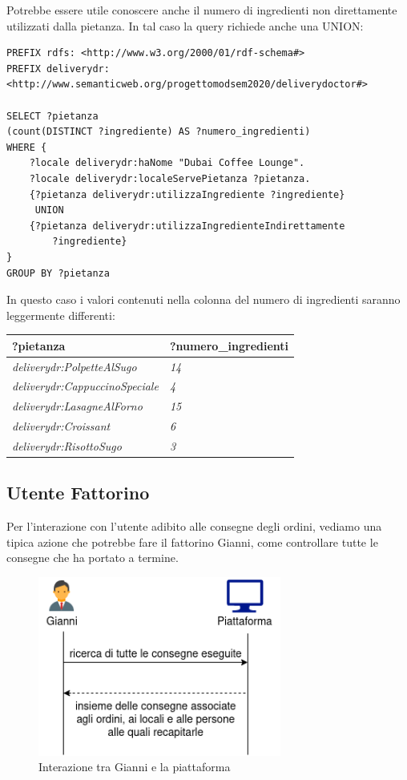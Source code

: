 \documentclass[12pt]{article}
\begin{document}
\newline
\newline
Potrebbe essere utile conoscere anche il numero di ingredienti non direttamente utilizzati dalla pietanza. In tal caso la query richiede anche una UNION:
\begin{lstlisting}[language=SPARQL]
PREFIX rdfs: <http://www.w3.org/2000/01/rdf-schema#>
PREFIX deliverydr: 
<http://www.semanticweb.org/progettomodsem2020/deliverydoctor#>

SELECT ?pietanza 
(count(DISTINCT ?ingrediente) AS ?numero_ingredienti) 
WHERE {
    ?locale deliverydr:haNome "Dubai Coffee Lounge".
    ?locale deliverydr:localeServePietanza ?pietanza.
    {?pietanza deliverydr:utilizzaIngrediente ?ingrediente}
     UNION 
    {?pietanza deliverydr:utilizzaIngredienteIndirettamente 
        ?ingrediente}
}
GROUP BY ?pietanza
\end{lstlisting}
In questo caso i valori contenuti nella colonna del numero di ingredienti saranno leggermente differenti:
\newline
\newline
\begin{tabularx}{\textwidth} { 
  | >{\centering\arraybackslash}X 
  | >{\centering\arraybackslash}X |}
 \hline
 \textbf{?pietanza} & \textbf{?numero\_ingredienti} \\
 \hline
 \textit{deliverydr:PolpetteAlSugo} & \textit{14}  \\
 \hline
 \textit{deliverydr:CappuccinoSpeciale} & \textit{4}  \\
 \hline
 \textit{deliverydr:LasagneAlForno} & \textit{15}  \\
 \hline
 \textit{deliverydr:Croissant} & \textit{6}  \\
 \hline
 \textit{deliverydr:RisottoSugo} & \textit{3}  \\
 \hline
\end{tabularx}

\subsection{Utente Fattorino}
Per l'interazione con l'utente adibito alle consegne degli ordini, vediamo una tipica azione che potrebbe fare il fattorino Gianni, come controllare tutte le consegne che ha portato a termine.

\begin{figure}[H]
    \centering
         \includegraphics[width=8cm]{files/interazioneGianni.png}
    \caption{Interazione tra Gianni e la piattaforma}
\end{figure}
\end{document}
